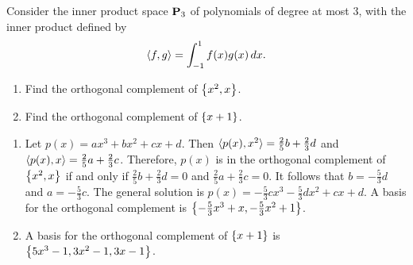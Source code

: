 \documentclass{ximera}
\begin{document}
\begin{exercise}
  Consider the inner product space $\textbf{P}_3$ of polynomials of degree
  at most $3$, with the inner product defined by
  \begin{equation*}
    \langle f,g \rangle = \int_{-1}^{1} f(x)g(x)\,dx.
  \end{equation*}
  \begin{enumerate}
  \item Find the orthogonal complement of $\left\{x^2,x\right\}$.
  \item Find the orthogonal complement of $\left\{x+1\right\}$.
  \end{enumerate}
  \begin{solution}
    \begin{enumerate}
    \item Let $p(x)=ax^3+bx^2+cx+d$. Then
      $\langle p(x), x^2 \rangle = \frac{2}{5}b + \frac{2}{3}d$ and
      $\langle p(x), x \rangle = \frac{2}{5}a + \frac{2}{3}c$.  Therefore,
      $p(x)$ is in the orthogonal complement of $\left\{x^2,x\right\}$ if and
      only if $\frac{2}{5}b + \frac{2}{3}d=0$ and
      $\frac{2}{5}a + \frac{2}{3}c=0$. It follows that
      $b=-\frac{5}{3}d$ and $a=-\frac{5}{3}c$. The general solution is
      $p(x) = -\frac{5}{3}cx^3 - \frac{5}{3}dx^2 + cx + d$. A basis
      for the orthogonal complement is
      $\left\{-\frac{5}{3} x^3 + x, -\frac{5}{3} x^2 + 1\right\}$.
    \item A basis for the orthogonal complement of $\left\{x+1\right\}$ is
      $\left\{5x^3-1, 3x^2-1, 3x-1\right\}$.      
    \end{enumerate}
  \end{solution}
\end{exercise}
\end{document}
